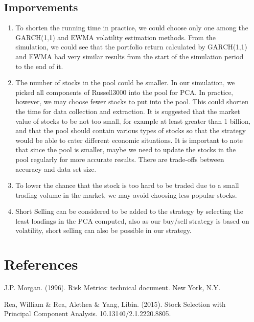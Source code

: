 \documentclass[11pts]{article}
\begin{document}
\subsection{Imporvements}
\label{sec:orgd8b4ebf}
\begin{enumerate}
\item To shorten the running time in practice, we could choose only one among the GARCH(1,1) and EWMA volatility estimation methods. From the simulation, we could see that the portfolio return calculated by GARCH(1,1) and EWMA had very similar results from the start of the simulation period to the end of it.

\item The number of stocks in the pool could be smaller. In our simulation, we picked all components of Russell3000 into the pool for PCA. In practice, however, we may choose fewer stocks to put into the pool. This could shorten the time for data collection and extraction. It is suggested that the market value of stocks to be not too small, for example at least greater than 1 billion, and that the pool should contain various types of stocks so that the strategy would be able to cater different economic situations. It is important to note that since the pool is smaller, maybe we need to update the stocks in the pool regularly for more accurate results. There are trade-offs between accuracy and data set size.

\item To lower the chance that the stock is too hard to be traded due to a small trading volume in the market, we may avoid choosing less popular stocks.

\item Short Selling can be considered to be added to the strategy by selecting the least loadings in the PCA computed, also as our buy/sell strategy is based on volatility, short selling can also be possible in our strategy.
\end{enumerate}
\section*{References}
\label{sec:org5b75a77}
\noindent J.P. Morgan. (1996). Risk Metrics: technical document. New York, N.Y.

\noindent Rea, William \& Rea, Alethea \& Yang, Libin. (2015). Stock Selection with Principal Component Analysis. 10.13140/2.1.2220.8805.
\end{document}
